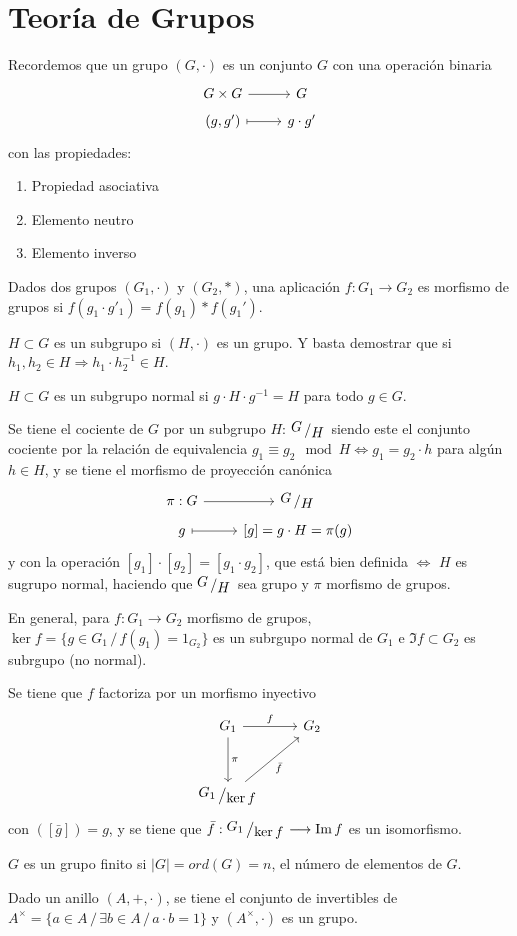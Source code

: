 \chapter{Teor\'ia de Grupos}
Recordemos que un grupo $(G,\cdot)$ es un conjunto $G$ con una operaci\'on binaria
$$\bt G \times G \rar & G \\[-5mm] (g,g') \rarmaps & g\cdot g' \et$$
con las propiedades:
\begin{enumerate}
    \item Propiedad asociativa
    \item Elemento neutro
    \item Elemento inverso
\end{enumerate}

Dados dos grupos $(G_1, \cdot)$ y $(G_2, *)$, una aplicaci\'on $f: G_1 \longrightarrow G_2$ es morfismo de grupos si $f(g_1 \cdot g'_1) = f(g_1) * f(g_1')$.

$H\subset G$ es un subgrupo si $(H, \cdot )$ es un grupo. Y basta demostrar que si $h_1,h_2\in H \Rightarrow h_1 \cdot h_2^{-1} \in H$.

$H \subset G$ es un subgrupo normal si $g \cdot H \cdot g^{-1} = H$ para todo $g \in G$. 

Se tiene el cociente de $G$ por un subgrupo $H$: $\modulo{G}{H}$ siendo este el conjunto cociente por la relaci\'on de equivalencia $g_1\equiv g_2 \mod H \iff g_1=g_2\cdot h$ para alg\'un $h \in H$, y se tiene el morfismo de proyecci\'on can\'onica
$$\bt \pi: G \rar & \modulo{G}{H} \\[-5mm] g \rarmaps & {[g]} = g\cdot H= \pi(g) \et$$
y con la operaci\'on $[g_1] \cdot [g_2] = [g_1\cdot g_2]$, que est\'a bien definida $\iff$ $H$ es sugrupo normal, haciendo que $\modulo{G}{H}$ sea grupo y $\pi$ morfismo de grupos.

En general, para $f:G_1 \longrightarrow G_2$ morfismo de grupos, $\ker f =\{ g\in G_1 \, / \, f(g_1) = 1_{G_2} \}$ es un subrgupo normal de $G_1$ e $\Im f\subset G_2$ es subrgupo (no normal). 

Se tiene que $f$ factoriza por un morfismo inyectivo
$$\bt G_1 \rar{f} \arrow{d}{\pi} & G_2 \\[5mm] \modulo{G_1}{\ker f} \arrow[swap]{ur}{\bar f} \et$$
con $ ([\bar g]) = g$, y se tiene que $\bar f: \modulo{G_1}{\ker f} \longrightarrow \Im f$ es un isomorfismo.

$G$ es un grupo finito si $|G| = ord(G) = n$, el n\'umero de elementos de $G$. 

Dado un anillo $(A,+,\cdot)$, se tiene el conjunto de invertibles de $A^{\times} = \{a\in A \, / \, \exists b\in A \, / \, a\cdot b=1\}$ y $(A^{\times}, \cdot)$ es un grupo.

